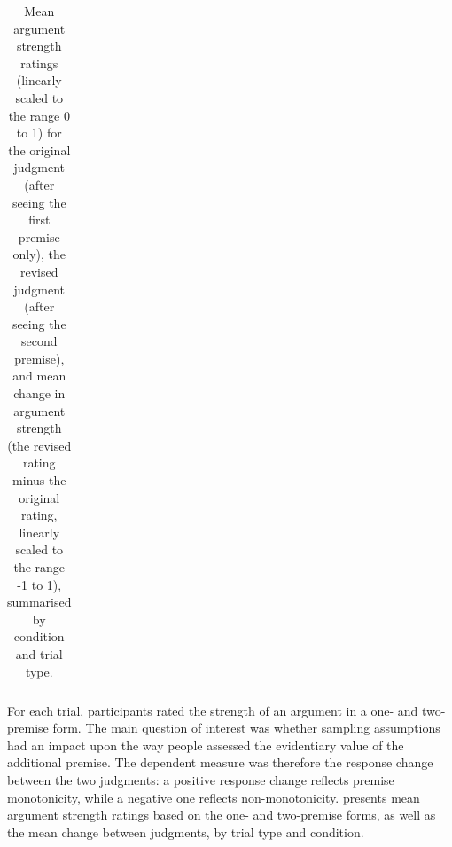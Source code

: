 \documentclass[doc,12pt]{apa}
\newcommand{\relevant}{\textsc{Both Relevant}}
\newcommand{\relevantdata}{\textsc{Relevant Fillers}}
\newcommand{\randomdata}{\textsc{Random Fillers}}
\newcommand{\random}{\textsc{Both Random}}
\begin{document}
\begin{table}[t]
\begin{tabular}{rrrrrrrr}
\bottomrule
\end{tabular}
\vspace{-5mm}
\caption{%
Mean argument strength ratings (linearly scaled to the range 0 to 1) for the original judgment (after seeing the first premise only), the revised judgment (after seeing the second premise), and mean change in argument strength (the revised rating minus the original rating, linearly scaled to the range -1 to 1), summarised by condition and trial type.
}
\label{tbl:descriptives}
\end{table}

For each trial, participants rated the strength of an argument in a one- and two-premise form. The main question of interest was whether sampling assumptions had an impact upon the way people assessed the evidentiary value of the additional premise. The dependent measure was therefore the response change between the two judgments: a positive response change reflects premise monotonicity, while a negative one reflects non-monotonicity.
 presents mean argument strength ratings based on the one- and two-premise forms, as well as the mean change between judgments, by trial type and condition.
\end{document}
